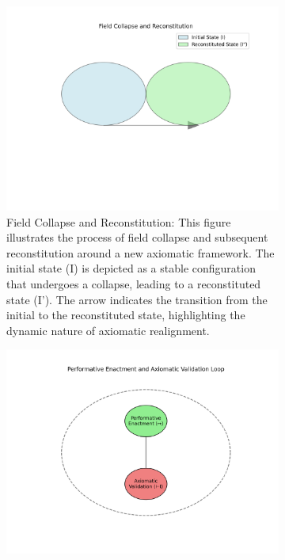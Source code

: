 \documentclass{article}
\begin{document}
\begin{figure}[h!]
    \centering
    \begin{subfigure}[b]{0.45\textwidth}
        \centering
        \includegraphics[width=\textwidth]{figures/ani_Field_Collapse.png}
        \caption{Field Collapse and Reconstitution: This figure illustrates the process of field collapse and subsequent reconstitution around a new axiomatic framework. The initial state (I) is depicted as a stable configuration that undergoes a collapse, leading to a reconstituted state (I'). The arrow indicates the transition from the initial to the reconstituted state, highlighting the dynamic nature of axiomatic realignment.}
        \label{fig:field_collapse}
    \end{subfigure}
    \hfill
    \begin{subfigure}[b]{0.45\textwidth}
        \centering
        \includegraphics[width=\textwidth]{figures/ani_Performative_Enactment.png}

\end{subfigure}
\end{figure}
\end{document}
